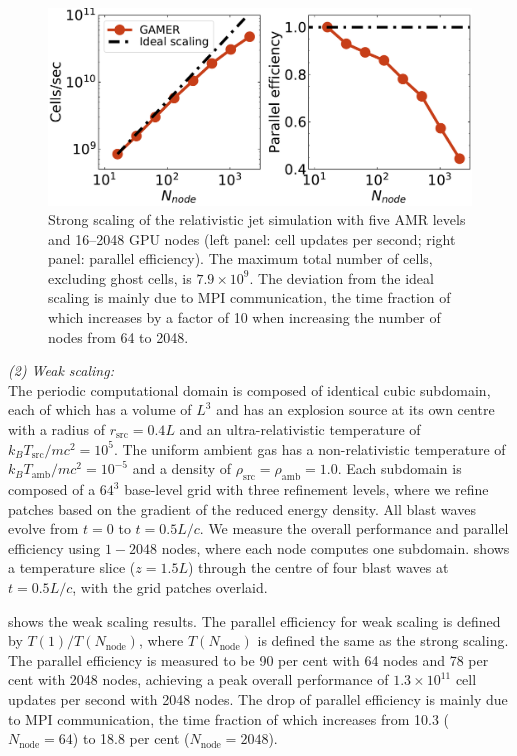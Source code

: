 \documentclass[twocolumn]{aastex63}
\begin{document}
\begin{figure}
\includegraphics[width=\columnwidth]{fig__benchmark_strongscaling.pdf}
\caption{Strong scaling of the relativistic jet simulation with five AMR levels and 16--2048 GPU nodes (left panel: cell updates per second; right panel: parallel efficiency). The maximum total number of cells, excluding ghost cells, is $7.9\times 10^{9}$. The deviation from the ideal scaling is mainly due to MPI communication, the time fraction of which increases by a factor of 10 when increasing the number of nodes from 64 to 2048.}
\label{fig:strong scaling}
\end{figure}

    \emph{(2) Weak scaling:}\\
    The periodic computational domain is composed of identical cubic subdomain, each of which has a volume of $L^3$ and has an explosion source at its own centre with a radius of $r_{\text{src}}=0.4L$ and an ultra-relativistic temperature of $k_{B}T_{\text{src}}/mc^2=10^{5}$. The uniform ambient gas has a non-relativistic temperature of $k_{B}T_{\text{amb}}/mc^2=10^{-5}$ and a density of $\rho_{\text{src}}=\rho_{\text{amb}}=1.0$. Each subdomain is composed of a $64^3$ base-level grid with three refinement levels, where we refine patches based on the gradient of the reduced energy density. All blast waves evolve from $t=0$ to $t=0.5L/c$. We measure the overall performance and parallel efficiency using $1-2048$ nodes, where each node computes one subdomain.  shows a temperature slice ($z=1.5L$) through the centre of four blast waves at $t=0.5L/c$, with the grid patches overlaid.

 shows the weak scaling results. The parallel efficiency for weak scaling is defined by $T(1)/T(N_{\text{node}})$, where $T(N_{\text{node}})$ is defined the same as the strong scaling. The parallel efficiency is measured to be 90 per cent with 64 nodes and 78 per cent with 2048 nodes, achieving a peak overall performance of $1.3\times 10^{11}$ cell updates per second with 2048 nodes. The drop of parallel efficiency is mainly due to MPI communication, the time fraction of which increases from 10.3 ($N_{\text{node}}=64$) to 18.8 per cent ($N_{\text{node}}=2048$).
\end{document}
